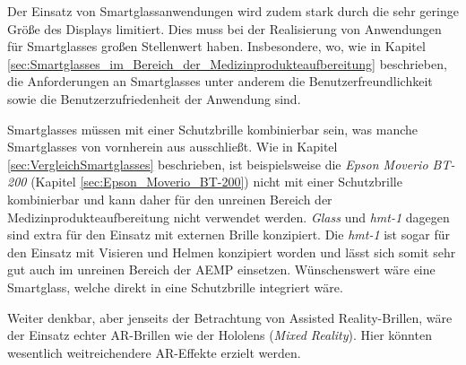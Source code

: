 Der Einsatz von Smartglassanwendungen wird zudem stark durch die sehr geringe Größe des Displays limitiert. Dies muss bei der Realisierung von Anwendungen für Smartglasses großen Stellenwert haben. Insbesondere, wo, wie in Kapitel \ref{sec:Smartglasses_im_Bereich_der_Medizinprodukteaufbereitung} beschrieben, die Anforderungen an Smartglasses unter anderem die Benutzerfreundlichkeit sowie die Benutzerzufriedenheit der Anwendung sind.

Smartglasses müssen mit einer Schutzbrille kombinierbar sein, was manche Smartglasses von vornherein aus ausschließt. Wie in Kapitel \ref{sec:VergleichSmartglasses} beschrieben, ist beispielsweise die \emph{Epson Moverio BT-200} (Kapitel \ref{sec:Epson_Moverio_BT-200}) nicht mit einer Schutzbrille kombinierbar und kann daher für den unreinen Bereich der Medizinprodukteaufbereitung nicht verwendet werden. \emph{Glass} und \emph{hmt-1} dagegen sind extra für den Einsatz mit externen Brille konzipiert. Die \emph{hmt-1} ist sogar für den Einsatz mit Visieren und Helmen konzipiert worden und lässt sich somit sehr gut auch im unreinen Bereich der AEMP einsetzen. Wünschenswert wäre eine Smartglass, welche direkt in eine Schutzbrille integriert wäre.

Weiter denkbar, aber jenseits der Betrachtung von Assisted Reality-Brillen, wäre der Einsatz echter AR-Brillen wie der Hololens (\emph{Mixed Reality}). Hier könnten wesentlich weitreichendere AR-Effekte erzielt werden. 

